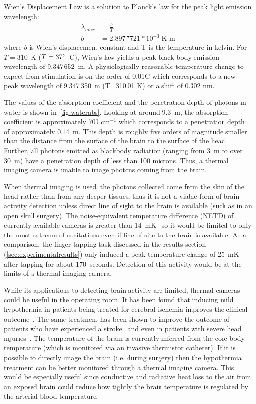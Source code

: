 Wien's Displacement Law is a solution to Planck's law for the peak light emission wavelength:
\begin{align}
  \lambda_{max} &= \frac{b}{T} \label{eq:wienslaw} \\
  b &= 2.897\,7721 * 10^{-3} \mbox{ K m} \nonumber
\end{align}
where $b$ is Wien's displacement constant and T is the temperature in kelvin.  For $T=310$~K ($T=37^\circ$~C), Wien's law yields a peak black-body emission wavelength of 9.347$\,$652~\textmu m. A physiologically reasonable temperature change to expect from stimulation is on the order of 0.01\degree C which corresponds to a new peak wavelength of 9.347$\,$350~\textmu m (T=310.01 K) or a shift of 0.302 nm.

The values of the absorption coefficient and the penetration depth of photons in water is shown in~\cref{fig:waterabs}. Looking at around 9.3~\textmu m, the absorption coefficient is approximately 700 cm$^{-1}$ which corresponds to a penetration depth of approximately 0.14~\textmu m.  This depth is roughly five orders of magnitude smaller than the distance from the surface of the brain to the surface of the head.  Further, all photons emitted as blackbody radiation (ranging from 3~\textmu m to over 30~\textmu m) have a penetration depth of less than 100 microns.  Thus, a thermal imaging camera is unable to image photons coming from the brain.

When thermal imaging is used, the photons collected come from the skin of the head rather than from any deeper tissues, thus it is not a viable form of brain activity detection unless direct line of sight to the brain is available (such as in an open skull surgery).  The noise-equivalent temperature difference (NETD) of currently available cameras is greater than 14~mK~\citep{flir,ici} so it would be limited to only the most extreme of excitations even if line of site to the brain is available.  As a comparison, the finger-tapping task discussed in the results section (\cref{sec:experimentalresults}) only induced a peak temperature change of 25~mK after tapping for about 170~seconds.  Detection of this activity would be at the limits of a thermal imaging camera.

While its applications to detecting brain activity are limited, thermal cameras could be useful in the operating room.  It has been found that inducing mild hypothermia in patients being treated for cerebral ischemia improves the clinical outcome~\citep{maher1993}. The same treatment has been shown to improve the outcome of patients who have experienced a stroke~\citep{krieger2001} and even in patients with severe head injuries~\citep{soukup2002}. The temperature of the brain is currently inferred from the core body temperature (which is monitored via an invasive thermistor catheter). If it is possible to directly image the brain (i.e. during surgery) then the hypothermia treatment can be better monitored through a thermal imaging camera.  This would be especially useful since conductive and radiative heat loss to the air from an exposed brain could reduce how tightly the brain temperature is regulated by the arterial blood temperature.


